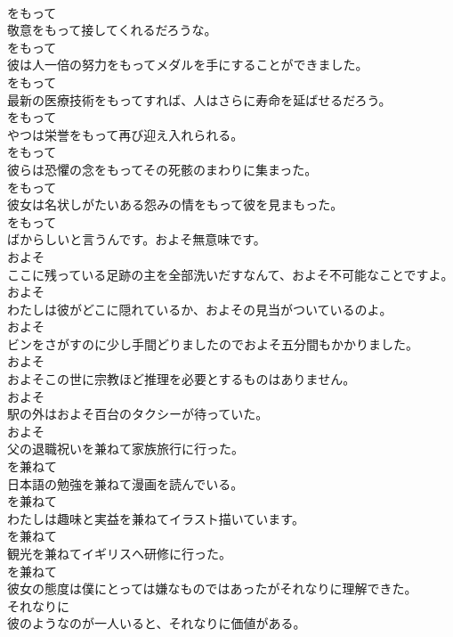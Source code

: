 \documentclass[8pt]{extreport}
\begin{document}
\begin{CJK}{UTF8}{min}
\\	をもって
\\	敬意をもって接してくれるだろうな。	
\\	をもって
\\	彼は人一倍の努力をもってメダルを手にすることができました。	
\\	をもって
\\	最新の医療技術をもってすれば、人はさらに寿命を延ばせるだろう。	
\\	をもって
\\	やつは栄誉をもって再び迎え入れられる。	
\\	をもって
\\	彼らは恐懼の念をもってその死骸のまわりに集まった。	
\\	をもって
\\	彼女は名状しがたいある怨みの情をもって彼を見まもった。	
\\	をもって
\\	ばからしいと言うんです。およそ無意味です。	
\\	およそ
\\	ここに残っている足跡の主を全部洗いだすなんて、およそ不可能なことですよ。	
\\	およそ
\\	わたしは彼がどこに隠れているか、およその見当がついているのよ。	
\\	およそ
\\	ビンをさがすのに少し手間どりましたのでおよそ五分間もかかりました。	
\\	およそ
\\	およそこの世に宗教ほど推理を必要とするものはありません。	
\\	およそ
\\	駅の外はおよそ百台のタクシーが待っていた。	
\\	およそ
\\	父の退職祝いを兼ねて家族旅行に行った。	
\\	を兼ねて
\\	日本語の勉強を兼ねて漫画を読んでいる。	
\\	を兼ねて
\\	わたしは趣味と実益を兼ねてイラスト描いています。	
\\	を兼ねて
\\	観光を兼ねてイギリスへ研修に行った。	
\\	を兼ねて
\\	彼女の態度は僕にとっては嫌なものではあったがそれなりに理解できた。	
\\	それなりに
\\	彼のようなのが一人いると、それなりに価値がある。	

\end{CJK}
\end{document}
